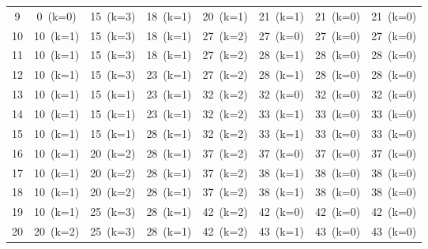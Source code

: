 \documentclass[12pt]{article}
\begin{document}
\begin{landscape}
\begin{longtable}{cccccccc}
9 & \cellcolor{red!20}0~(k=0) & \cellcolor{green!40}15~(k=3) & \cellcolor{green!40}18~(k=1) & \cellcolor{green!40}20~(k=1) & \cellcolor{green!40}21~(k=1) & \cellcolor{red!20}21~(k=0) & \cellcolor{red!20}21~(k=0) \\
10 & \cellcolor{green!40}10~(k=1) & \cellcolor{green!40}15~(k=3) & \cellcolor{green!40}18~(k=1) & \cellcolor{green!40}27~(k=2) & \cellcolor{red!20}27~(k=0) & \cellcolor{red!20}27~(k=0) & \cellcolor{red!20}27~(k=0) \\
11 & \cellcolor{green!40}10~(k=1) & \cellcolor{green!40}15~(k=3) & \cellcolor{green!40}18~(k=1) & \cellcolor{green!40}27~(k=2) & \cellcolor{green!40}28~(k=1) & \cellcolor{red!20}28~(k=0) & \cellcolor{red!20}28~(k=0) \\
12 & \cellcolor{green!40}10~(k=1) & \cellcolor{green!40}15~(k=3) & \cellcolor{green!40}23~(k=1) & \cellcolor{green!40}27~(k=2) & \cellcolor{green!40}28~(k=1) & \cellcolor{red!20}28~(k=0) & \cellcolor{red!20}28~(k=0) \\
13 & \cellcolor{green!40}10~(k=1) & \cellcolor{yellow!50}15~(k=1) & \cellcolor{green!40}23~(k=1) & \cellcolor{green!40}32~(k=2) & \cellcolor{red!20}32~(k=0) & \cellcolor{red!20}32~(k=0) & \cellcolor{red!20}32~(k=0) \\
14 & \cellcolor{green!40}10~(k=1) & \cellcolor{yellow!50}15~(k=1) & \cellcolor{green!40}23~(k=1) & \cellcolor{green!40}32~(k=2) & \cellcolor{green!40}33~(k=1) & \cellcolor{red!20}33~(k=0) & \cellcolor{red!20}33~(k=0) \\
15 & \cellcolor{green!40}10~(k=1) & \cellcolor{yellow!50}15~(k=1) & \cellcolor{green!40}28~(k=1) & \cellcolor{green!40}32~(k=2) & \cellcolor{green!40}33~(k=1) & \cellcolor{red!20}33~(k=0) & \cellcolor{red!20}33~(k=0) \\
16 & \cellcolor{green!40}10~(k=1) & \cellcolor{green!40}20~(k=2) & \cellcolor{green!40}28~(k=1) & \cellcolor{green!40}37~(k=2) & \cellcolor{red!20}37~(k=0) & \cellcolor{red!20}37~(k=0) & \cellcolor{red!20}37~(k=0) \\
17 & \cellcolor{green!40}10~(k=1) & \cellcolor{green!40}20~(k=2) & \cellcolor{green!40}28~(k=1) & \cellcolor{green!40}37~(k=2) & \cellcolor{green!40}38~(k=1) & \cellcolor{red!20}38~(k=0) & \cellcolor{red!20}38~(k=0) \\
18 & \cellcolor{green!40}10~(k=1) & \cellcolor{green!40}20~(k=2) & \cellcolor{green!40}28~(k=1) & \cellcolor{green!40}37~(k=2) & \cellcolor{green!40}38~(k=1) & \cellcolor{red!20}38~(k=0) & \cellcolor{red!20}38~(k=0) \\
19 & \cellcolor{green!40}10~(k=1) & \cellcolor{green!40}25~(k=3) & \cellcolor{green!40}28~(k=1) & \cellcolor{green!40}42~(k=2) & \cellcolor{red!20}42~(k=0) & \cellcolor{red!20}42~(k=0) & \cellcolor{red!20}42~(k=0) \\
20 & \cellcolor{green!40}20~(k=2) & \cellcolor{green!40}25~(k=3) & \cellcolor{green!40}28~(k=1) & \cellcolor{green!40}42~(k=2) & \cellcolor{green!40}43~(k=1) & \cellcolor{red!20}43~(k=0) & \cellcolor{red!20}43~(k=0) \\
\bottomrule
\end{longtable}
\end{landscape}
\end{document}
